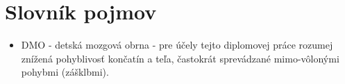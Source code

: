 \chapter*{Slovník pojmov} %
\begin{itemize}
  \item DMO - detská mozgová obrna - pre účely tejto diplomovej práce rozumej znížená pohyblivosť končatín a teľa, častokrát sprevádzané mimo-vôlonými pohybmi (zášklbmi).
  
\end{itemize}
